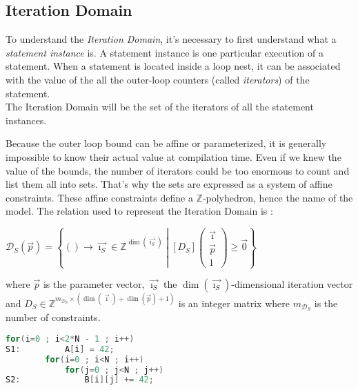 \documentclass[paper=a4, fontsize=11.5pt]{scrartcl}
\numberwithin{equation}{section}        %
\numberwithin{figure}{section}          %
\numberwithin{table}{section}               %
\begin{document}
    \subsection{Iteration Domain}
        To understand the \textit{Iteration Domain}, it's necessary to first understand
        what a \textit{statement instance} is. A statement instance is one particular
        execution of a statement. When a statement is located inside a loop nest, 
        it can be associated with the value of the all the outer-loop counters
        (called \textit{iterators}) of the statement.\\
        The Iteration Domain will be the set of the iterators of all the statement
        instances.

        Because the outer loop bound can be affine or parameterized, it is generally impossible to
        know their actual value at compilation time. Even if we knew the value of the
        bounds, the number of iterators could be too enormous to count and list them all into sets.
        That's why the sets are expressed as a system of affine constraints.
        These affine constraints define a $\mathbb{Z}$-polyhedron, hence the name of the model.
        The relation used to represent the Iteration Domain is :
        \begin{center}
            $ \mathcal{D}_S(\vec{p}) = \left\{() \to \vec{\imath_S} \in \mathbb{Z}^{\dim(\vec{\imath_S})}
            \middle|
            \left[D_S\right]\begin{pmatrix}\vec{\imath} \\ \vec{p} \\ 1\end{pmatrix}
            \geq \vec{0}
            \right\}$
        \end{center}
        where $\vec{p}$ is the parameter vector, $\vec{\imath_S}$ the $\dim(\vec{\imath_S})$-dimensional iteration vector and
        $D_S \in \mathbb{Z}^{m_{\mathcal{D}_S} \times (\dim(\vec{\imath})+\dim(\vec{p})+1)}$
        is an integer matrix where $m_{\mathcal{D}_S}$ is the number of constraints.
        \\

\begin{lstlisting}[frame=single, language=C, caption={Simple code for polyhedral model example}, label={lst:polyhedral_example}]
        for(i=0 ; i<2*N - 1 ; i++)
S1:         A[i] = 42;
        for(i=0 ; i<N ; i++)
            for(j=0 ; j<N ; j++)
S2:             B[i][j] += 42;
\end{lstlisting}
        
\end{document}
